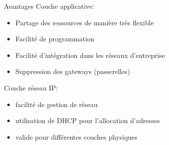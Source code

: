 \begin{frame}{Avantages}
Couche applicative:
\begin{itemize}
\item Partage des ressources de manière très flexible %
\item Facilité de programmation %
\item Facilité d’intégration dans les réseaux d’entreprise %
\item Suppression des gateways (passerelles)%
\end{itemize}
\vspace{5mm}
Couche réseau IP:
\begin{itemize}
\item facilité de gestion de réseau
\item utilisation de DHCP pour l’allocation d’adresses
\item valide pour différentes couches physiques
\end{itemize}
\end{frame}

